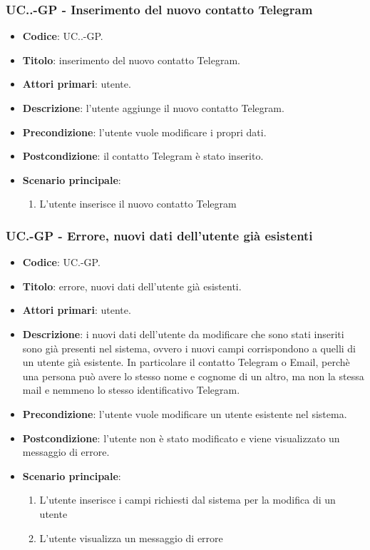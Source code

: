 			\subsubsection{UC\theuccount.\thesubuccount.\thesubsubuccount-GP - Inserimento del nuovo contatto Telegram}

				\begin{itemize}
					\item \textbf{Codice}: UC\theuccount.\thesubuccount.\thesubsubuccount-GP.
					\item \textbf{Titolo}: inserimento del nuovo contatto Telegram.
					\item \textbf{Attori primari}: utente.
					\item \textbf{Descrizione}: l'utente aggiunge il nuovo contatto Telegram.
					\item \textbf{Precondizione}: l'utente vuole modificare i propri dati.
					\item \textbf{Postcondizione}: il contatto Telegram è stato inserito.
					\item \textbf{Scenario principale}:
					\begin{enumerate}
						\item L'utente inserisce il nuovo contatto Telegram
					\end{enumerate}
				\end{itemize}

		\subsubsection{UC\theuccount.\thesubuccount-GP - Errore, nuovi dati dell'utente già esistenti}

		\begin{itemize}
			\item \textbf{Codice}: UC\theuccount.\thesubuccount-GP.
			\item \textbf{Titolo}: errore, nuovi dati dell'utente già esistenti.
			\item \textbf{Attori primari}: utente.
			\item \textbf{Descrizione}: i nuovi dati dell'utente da modificare che sono stati inseriti sono già
			presenti nel sistema, ovvero i nuovi campi corrispondono a quelli di un utente già esistente.
			In particolare il contatto Telegram o Email, perchè una persona può avere lo stesso nome e cognome di un
			altro, ma non la stessa mail e nemmeno lo stesso identificativo Telegram.
			\item \textbf{Precondizione}: l'utente vuole modificare un utente esistente nel sistema.
			\item \textbf{Postcondizione}: l'utente non è stato modificato e viene visualizzato un messaggio di errore.
			\item \textbf{Scenario principale}:
			\begin{enumerate}
				\item L'utente inserisce i campi richiesti dal sistema per la modifica di un utente
				\item L'utente visualizza un messaggio di errore
			\end{enumerate}
		\end{itemize}


